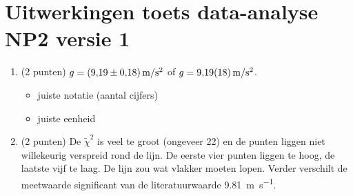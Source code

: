 \documentclass[a4paper,11pt]{article}
\begin{document}
\section*{Uitwerkingen toets data-analyse NP2 versie 1}

\begin{enumerate}
  \item (2 punten) $g = \SI[separate-uncertainty=true]{9,19 +- 0,18}{\meter\per\second\squared}$ of $g = \SI[separate-uncertainty=false]{9,19 +- 0,18}{\meter\per\second\squared}$.
  \begin{itemize}
    \item juiste notatie (aantal cijfers)
    \item juiste eenheid
  \end{itemize}
  \item (2 punten) De $\tilde\chi^2$ is veel te groot (ongeveer 22) en de punten liggen niet willekeurig verspreid rond de lijn. De eerste vier punten liggen te hoog, de laatste vijf te laag. De lijn zou wat vlakker moeten lopen. Verder verschilt de meetwaarde significant van de literatuurwaarde \SI{9,81}{\meter\per\second}.


\end{enumerate}
\end{document}

